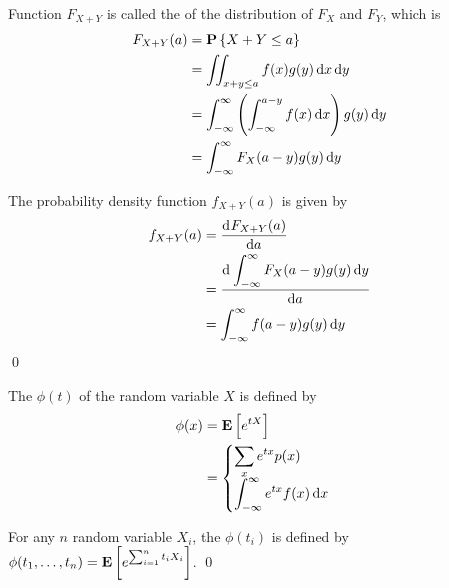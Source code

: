 \begin{definition}
    Function $F_{X+Y}$ is called the  of the distribution of $F_X$ and $F_Y$, which is
    \begin{equation}
        \begin{aligned}
            F_{X+Y}(a) &= \probability{X + Y \leq a} \\
            &= \iint_{x+y \leq a} f(x) g(y) \dif{x} \dif{y} \\
            &= \int_{-\infty}^\infty \left( \int_{-\infty}^{a - y} f(x) \dif{x} \right) g(y) \dif{y} \\
            &= \int_{-\infty}^\infty F_X (a-y)g(y) \dif{y}
        \end{aligned}
    \end{equation}
    
    The probability density function $f_{X+Y}(a)$ is given by 
    \begin{equation}
        \begin{aligned}
            f_{X+Y}(a) &= \dod{F_{X+Y}(a)}{a} \\
            &= \dod{\displaystyle \int_{-\infty}^\infty F_X (a-y)g(y) \dif{y}}{a} \\
            &= \int_{-\infty}^{\infty} f(a-y) g(y) \dif{y}
        \end{aligned}
    \end{equation} \qed
\end{definition}




\begin{definition}
    The  $\phi(t)$ of the random variable $X$ is defined by
    \begin{equation}
        \begin{aligned}
            \phi(x) &= \expect{e^{tX}} \\
            &= \begin{cases}
                 \displaystyle \sum_x e^{tx} p(x)\\
                 \displaystyle \int_{-\infty}^\infty e^{tx} f(x) \dif{x}
            \end{cases}
        \end{aligned}
    \end{equation}
    
    For any $n$ random variable $X_i$, the  $\phi(t_i)$ is defined by $\phi(t_1, \dots, t_n) = \mathop{\bf E\/}\displaystyle \left[  e^{ \sum_{i=1}^n t_i X_i} \right]$.
    \qed
\end{definition}

